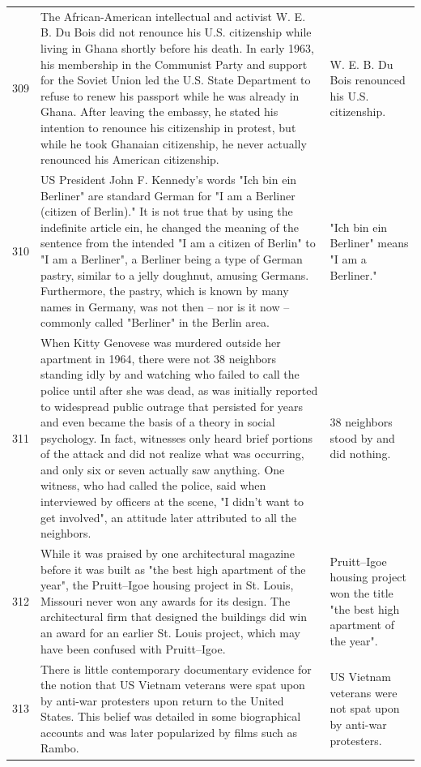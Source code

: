 \begin{tabular}{c|p{}|p{}}
309 & The African-American intellectual and activist W. E. B. Du Bois did not renounce his U.S. citizenship while living in Ghana shortly before his death. In early 1963, his membership in the Communist Party and support for the Soviet Union led the U.S. State Department to refuse to renew his passport while he was already in Ghana. After leaving the embassy, he stated his intention to renounce his citizenship in protest, but while he took Ghanaian citizenship, he never actually renounced his American citizenship. & W. E. B. Du Bois renounced his U.S. citizenship. \\
310 & US President John F. Kennedy's words "Ich bin ein Berliner" are standard German for "I am a Berliner (citizen of Berlin)." It is not true that by using the indefinite article ein, he changed the meaning of the sentence from the intended "I am a citizen of Berlin" to "I am a Berliner", a Berliner being a type of German pastry, similar to a jelly doughnut, amusing Germans. Furthermore, the pastry, which is known by many names in Germany, was not then – nor is it now – commonly called "Berliner" in the Berlin area. & "Ich bin ein Berliner" means "I am a Berliner." \\
311 & When Kitty Genovese was murdered outside her apartment in 1964, there were not 38 neighbors standing idly by and watching who failed to call the police until after she was dead, as was initially reported to widespread public outrage that persisted for years and even became the basis of a theory in social psychology. In fact, witnesses only heard brief portions of the attack and did not realize what was occurring, and only six or seven actually saw anything. One witness, who had called the police, said when interviewed by officers at the scene, "I didn't want to get involved", an attitude later attributed to all the neighbors. & 38 neighbors stood by and did nothing. \\
312 & While it was praised by one architectural magazine before it was built as "the best high apartment of the year", the Pruitt–Igoe housing project in St. Louis, Missouri never won any awards for its design. The architectural firm that designed the buildings did win an award for an earlier St. Louis project, which may have been confused with Pruitt–Igoe. & Pruitt–Igoe housing project won the title "the best high apartment of the year". \\
313 & There is little contemporary documentary evidence for the notion that US Vietnam veterans were spat upon by anti-war protesters upon return to the United States. This belief was detailed in some biographical accounts and was later popularized by films such as Rambo. & US Vietnam veterans were not spat upon by anti-war protesters. \\

\end{tabular}
